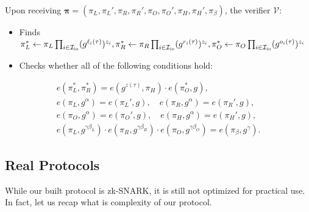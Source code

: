 \documentclass[../lecture-notes-148x210.tex]{subfiles}
\begin{document}
\begin{tcolorbox}
    Upon receiving $\boldsymbol{\pi} = (\pi_L,\pi_L',\pi_R,\pi_R',\pi_O,\pi_O',\pi_H,\pi_H',\pi_{\beta})$, the verifier $\mathcal{V}$:
    \begin{itemize}[label=]
        \item Finds $\pi_L^* \gets \pi_L\prod_{i \in \mathcal{I}_{\text{io}}} (g^{\ell_i(\tau)})^{z_i},\pi_R^* \gets \pi_R\prod_{i \in \mathcal{I}_{\text{io}}} (g^{r_i(\tau)})^{z_i}, \\
        \pi_O^* \gets \pi_O\prod_{i \in \mathcal{I}_{\text{io}}} (g^{o_i(\tau)})^{z_i}$
        \item Checks whether all of the following conditions hold:
    \end{itemize}
    \begin{align*}
        e(\pi_L^*, \pi_R^*) = e(g^{z(\tau)}, \pi_H) \cdot e(\pi_O^*, g), \\
        e(\pi_L, g^{\alpha}) = e(\pi_L', g), \quad e(\pi_R, g^{\alpha}) = e(\pi_R', g), \\
        e(\pi_O, g^{\alpha}) = e(\pi_O', g), \quad e(\pi_H, g^{\alpha}) = e(\pi_H', g), \\
        e(\pi_L, g^{\gamma\beta_L}) \cdot e(\pi_R, g^{\gamma\beta_R}) \cdot e(\pi_O, g^{\gamma\beta_O}) = e(\pi_{\beta}, g^{\gamma}).
    \end{align*}
\end{tcolorbox}

\subsection{Real Protocols}

While our built protocol is zk-SNARK, it is still not optimized for practical use. In fact, let us recap what is complexity of our protocol.
\end{document}
